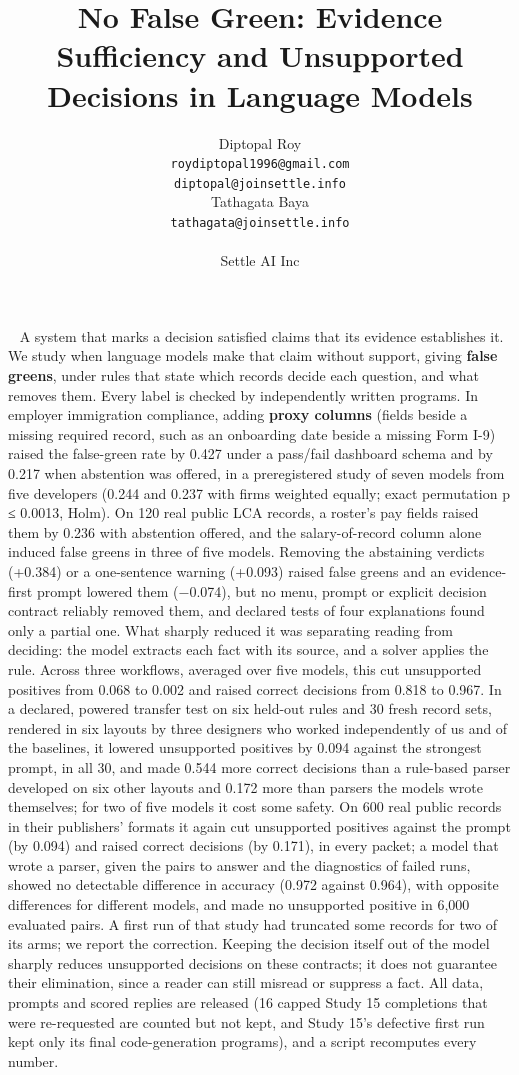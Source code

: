 \documentclass[10pt,twocolumn]{article}
\title{\Large\bfseries No False Green: Evidence Sufficiency and Unsupported Decisions in Language Models}
\author{\begin{tabular}[t]{c}Diptopal Roy\\ {\normalsize\texttt{roydiptopal1996@gmail.com}}\\ {\normalsize\texttt{diptopal@joinsettle.info}}\end{tabular}\qquad \begin{tabular}[t]{c}Tathagata Baya\\ {\normalsize\texttt{tathagata@joinsettle.info}}\end{tabular}\\[6pt] \normalsize Settle AI Inc}
\date{}
\makeatletter
\renewcommand\maketitle{\twocolumn[{\centering
  {\sffamily\LARGE\bfseries\@title\par}\vskip 10pt
  {\large\@author\par}\vskip 14pt}]}
\renewenvironment{abstract}{\noindent{\sffamily\bfseries Abstract.}\ \small}{\par\vskip 6pt}
\makeatother
\begin{document}
\maketitle
\thispagestyle{empty}
\begin{abstract}
A system that marks a decision satisfied claims that its evidence establishes it. We study when language models make that claim without support, giving \textbf{false greens}, under rules that state which records decide each question, and what removes them. Every label is checked by independently written programs. In employer immigration compliance, adding \textbf{proxy columns} (fields beside a missing required record, such as an onboarding date beside a missing Form I-9) raised the false-green rate by 0.427 under a pass/fail dashboard schema and by 0.217 when abstention was offered, in a preregistered study of seven models from five developers (0.244 and 0.237 with firms weighted equally; exact permutation p ≤ 0.0013, Holm). On 120 real public LCA records, a roster's pay fields raised them by 0.236 with abstention offered, and the salary-of-record column alone induced false greens in three of five models. Removing the abstaining verdicts (+0.384) or a one-sentence warning (+0.093) raised false greens and an evidence-first prompt lowered them (−0.074), but no menu, prompt or explicit decision contract reliably removed them, and declared tests of four explanations found only a partial one. What sharply reduced it was separating reading from deciding: the model extracts each fact with its source, and a solver applies the rule. Across three workflows, averaged over five models, this cut unsupported positives from 0.068 to 0.002 and raised correct decisions from 0.818 to 0.967. In a declared, powered transfer test on six held-out rules and 30 fresh record sets, rendered in six layouts by three designers who worked independently of us and of the baselines, it lowered unsupported positives by 0.094 against the strongest prompt, in all 30, and made 0.544 more correct decisions than a rule-based parser developed on six other layouts and 0.172 more than parsers the models wrote themselves; for two of five models it cost some safety. On 600 real public records in their publishers' formats it again cut unsupported positives against the prompt (by 0.094) and raised correct decisions (by 0.171), in every packet; a model that wrote a parser, given the pairs to answer and the diagnostics of failed runs, showed no detectable difference in accuracy (0.972 against 0.964), with opposite differences for different models, and made no unsupported positive in 6,000 evaluated pairs. A first run of that study had truncated some records for two of its arms; we report the correction. Keeping the decision itself out of the model sharply reduces unsupported decisions on these contracts; it does not guarantee their elimination, since a reader can still misread or suppress a fact. All data, prompts and scored replies are released (16 capped Study 15 completions that were re-requested are counted but not kept, and Study 15's defective first run kept only its final code-generation programs), and a script recomputes every number.

\end{abstract}
\end{document}
